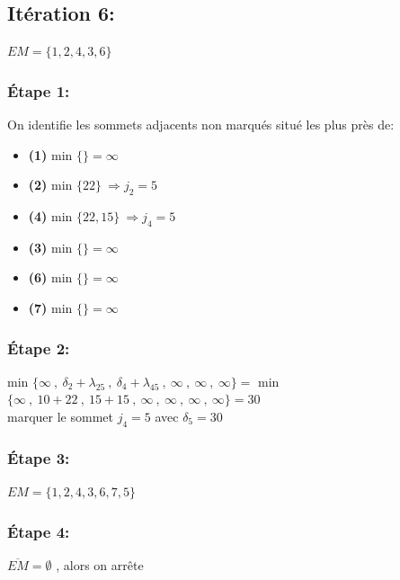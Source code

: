 \documentclass{article}
\begin{document}
\subsection*{Itération 6:}
$EM = \{1,2,4,3,6\}$
\subsubsection*{Étape 1:}
On identifie les sommets adjacents non marqués situé les plus près de:
\begin{itemize}
    \item \textbf{(1)} min $\{\}=\infty$
    \item \textbf{(2)} min $\{22\}\: \Rightarrow j_2 = 5$ 
    \item \textbf{(4)} min $\{22,15\}\: \Rightarrow j_4 =5$ 
    \item \textbf{(3)} min $\{\}= \infty$
    \item \textbf{(6)} min $\{\}= \infty$
    \item \textbf{(7)} min $\{\}= \infty$
\end{itemize}
\subsubsection*{Étape 2:}
min $\{ \infty \:,\: \delta_2 +\lambda_{25} \:,\: \delta_4 + \lambda_{45} \:,\: \infty \:,\:\infty \:,\:\infty \} = $ min $\{\infty \:,\: 10+22\:,\:15+15\:,\: \infty \:,\:\infty \:,\:\infty \:,\:\infty\}=30$\\
marquer le sommet $j_4=5$ avec $\delta_5=30$ 
\subsubsection*{Étape 3:}
$EM=\{1,2,4,3,6,7,5\}$
\subsubsection*{Étape 4:}
$\overline{EM} = \emptyset $ , alors on arrête 
\end{document}
